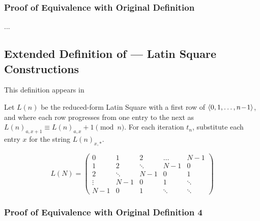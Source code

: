 \documentclass[conference]{IEEEtran}
\begin{document}

\subsubsection{Proof of Equivalence with Original Definition } ...

\subsection{Extended Definition  of \TotalExtensions\xspace --- Latin Square Constructions}

This definition appears in \cite{Bolker_2016}

Let $L(n)$ be the reduced-form Latin Square with a first row of $\langle 0, 1, \dots, n\!-\!1 \rangle$, and where each row progresses from one entry to the next as $L(n)_{a,x+1} \equiv L(n)_{a,x} + 1 \pmod{n}$. For each iteration $t_n$, substitute each entry $x$ for the string $L(n)_{x,*}$.


\begin{equation}
L(N) = \begin{pmatrix}
0 & 1 & 2 & \dots & N\!\!-\!\!1 \\
1 & 2 & \ddots & N\!\!-\!\!1 & 0 \\
2 & \ddots & N\!\!-\!\!1 & 0 & 1 \\
\vdots & N\!\!-\!\!1 & 0 & 1 & \ddots \\
N\!\!-\!\!1& 0 & 1 & \ddots & \ddots
\end{pmatrix}
\end{equation}

\subsubsection{Proof of Equivalence with Original Definition 4}

\end{document}
